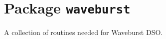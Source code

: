 \chapter{Package \texttt{waveburst}}

A collection of routines needed for Waveburst DSO. 

\newpage



